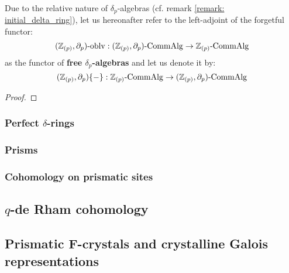             \begin{convention}
                Due to the relative nature of $\delta_p$-algebras (cf. remark \ref{remark: initial_delta_ring}), let us hereonafter refer to the left-adjoint of the forgetful functor:
                    $$(\mathbb{Z}_{(p)}, \partial_p)\text{-}\mathrm{oblv}: (\mathbb{Z}_{(p)}, \partial_p)\text{-}\mathrm{Comm}\mathrm{Alg} \to \mathbb{Z}_{(p)}\text{-}\mathrm{Comm}\mathrm{Alg}$$
                as the functor of \textbf{free $\delta_p$-algebras} and let us denote it by:
                    $$(\mathbb{Z}_{(p)}, \partial_p)\{-\}: \mathbb{Z}_{(p)}\text{-}\mathrm{Comm}\mathrm{Alg} \to (\mathbb{Z}_{(p)}, \partial_p)\text{-}\mathrm{Comm}\mathrm{Alg}$$
            \end{convention}
            \begin{proposition}
                
            \end{proposition}
                \begin{proof}
                    
                \end{proof}
            
        \subsubsection{Perfect \texorpdfstring{$\delta$}{}-rings}
        
        \subsubsection{Prisms}
        
        \subsubsection{Cohomology on prismatic sites}
        
    \subsection{\texorpdfstring{$q$}{}-de Rham cohomology}
    
    \subsection{Prismatic F-crystals and crystalline Galois representations}